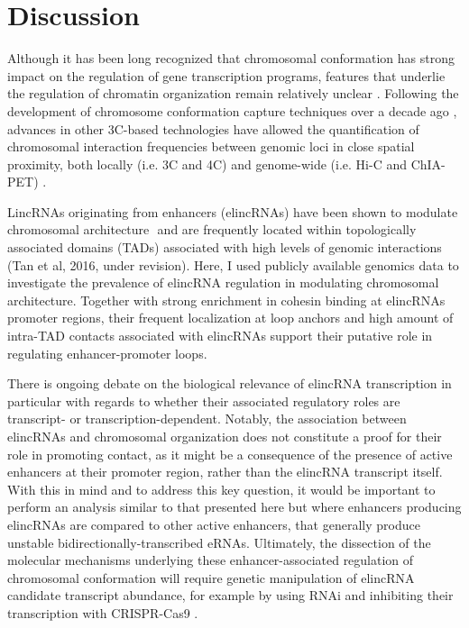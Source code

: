 \documentclass[11pt,a4paper]{report}
\begin{document}
\FloatBarrier
\section*{Discussion}

Although it has been long recognized that chromosomal conformation has strong impact on the regulation of gene transcription programs, features that underlie the regulation of chromatin organization remain relatively unclear \cite{Bonev2016}⁠. Following the development of chromosome conformation capture techniques over a decade ago \cite{Dekker2002}⁠, advances in other 3C-based technologies have allowed the quantification of chromosomal interaction frequencies between genomic loci in close spatial proximity, both locally (i.e. 3C and 4C) and genome-wide (i.e. Hi-C and ChIA-PET) \cite{Dekker2013}.

LincRNAs originating from enhancers (elincRNAs) have been shown to modulate chromosomal architecture \cite{Yin2015}⁠ and are frequently located within topologically associated domains (TADs) associated with high levels of genomic interactions (Tan et al, 2016, under revision). Here, I used publicly available genomics data to investigate the prevalence of elincRNA regulation in modulating chromosomal architecture. Together with strong enrichment in cohesin binding at elincRNAs promoter regions, their frequent localization at loop anchors and high amount of intra-TAD contacts associated with elincRNAs support their putative role in regulating enhancer-promoter loops. 

There is ongoing debate on the biological relevance of elincRNA transcription in particular with regards to  whether their associated regulatory roles are transcript- or transcription-dependent. Notably, the association between elincRNAs and chromosomal organization does not constitute a proof for their role in promoting contact, as it might be a consequence of the presence of active enhancers at their promoter region, rather than the elincRNA transcript itself. With this in mind and to address this key question, it would be important to perform an analysis similar to that presented here but where enhancers producing elincRNAs are compared to other active enhancers, that generally produce unstable bidirectionally-transcribed eRNAs. Ultimately, the dissection of the molecular mechanisms underlying these enhancer-associated regulation of chromosomal conformation will require genetic manipulation of elincRNA candidate transcript abundance, for example by using RNAi and inhibiting their transcription with CRISPR-Cas9 \cite{Li2013}⁠.
\end{document}
